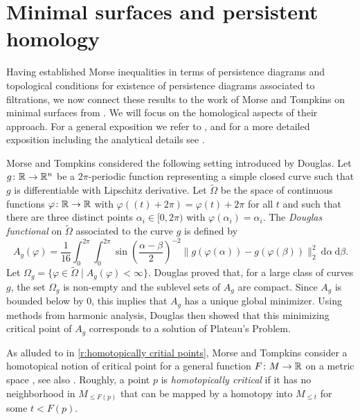 
\section{Minimal surfaces and persistent homology} \label{s:surfaces}

Having established Morse inequalities in terms of persistence diagrams and topological conditions for existence of persistence diagrams associated to filtrations, we now connect these results to the work of Morse and Tompkins on minimal surfaces from \cite{Morse.1939}.
We will focus on the homological aspects of their approach.
For a general exposition we refer to \cite[Sections 4.3--5]{Bott.1980}, and for a more detailed exposition including the analytical details see \cite[Section II.6]{Struwe.1988}.

Morse and Tompkins considered the following setting introduced by Douglas.
Let $g \colon \mathbb{R} \to \mathbb{R}^n$ be a $2\pi$-periodic function representing a simple closed curve such that $g$ is differentiable with Lipschitz derivative.
Let $\widetilde{\Omega}$ be the space of continuous functions $\varphi \colon \mathbb{R} \to \mathbb{R}$ with $\varphi((t)+2\pi) = \varphi(t) + 2\pi$ for all $t$ and such that there are three distinct points $\alpha_i \in [0,2\pi)$ with $\varphi(\alpha_i)=\alpha_i$.
The \emph{Douglas functional} on $\widetilde \Omega$ associated to the curve $g$ is defined by
\begin{equation*}
A_g(\varphi) = \frac{1}{16} \int_0^{2\pi} \int_0^{2\pi} \sin \left( \frac{\alpha-\beta}{2} \right)^{-2} \! \lVert g(\varphi(\alpha)) - g(\varphi(\beta)) \rVert_2^2 \ \mathrm{d}\alpha \ \mathrm{d}\beta.
\end{equation*}
Let $\Omega_g = \{\varphi \in \widetilde\Omega \mid A_g(\varphi) < \infty\}$.
Douglas proved that, for a large class of curves $g$, the set $\Omega_g$ is non-empty and the sublevel sets of $A_g$ are compact.
Since $A_g$ is bounded below by $0$, this implies that $A_g$ has a unique global minimizer.
Using methods from harmonic analysis, Douglas then showed that this minimizing critical point of $A_g$ corresponds to a solution of Plateau's Problem.

As alluded to in \cref{r:homotopically critial points}, Morse and Tompkins consider a homotopical notion of critical point for a general function $F \colon M \to \mathbb{R}$ on a metric space \cite[p.~445]{Morse.1939}, see also \cite{Morse.1943}.
Roughly, a point $p$ is \emph{homotopically critical} if it has no neighborhood in $M_{\leq F(p)}$ that can be mapped by a homotopy into $M_{\leq t}$ for some $t<F(p)$.

